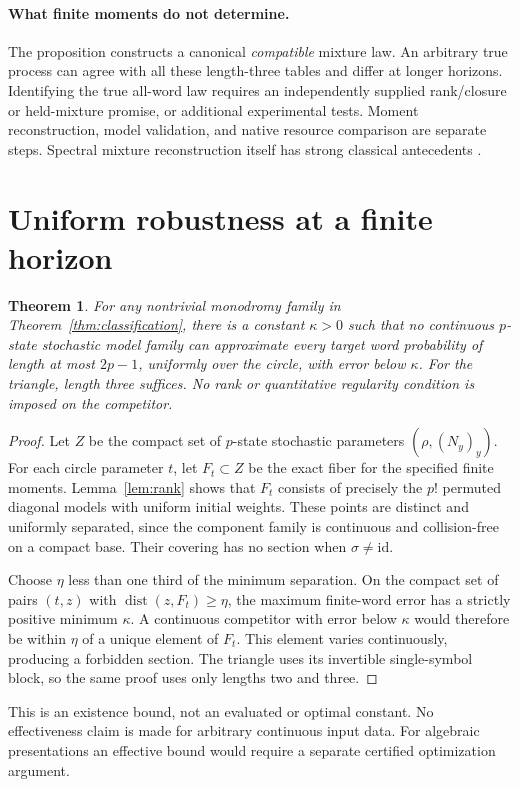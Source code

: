 \documentclass[11pt]{article}
\newtheorem{theorem}{Theorem}[section]
\theoremstyle{definition}\newtheorem{definition}[theorem]{Definition}
\theoremstyle{remark}\newtheorem{remark}[theorem]{Remark}
\newcommand{\dist}{\operatorname{dist}}
\begin{document}
\paragraph{What finite moments do not determine.}
The proposition constructs a canonical \emph{compatible} mixture law. An arbitrary true process can agree with all these length-three tables and differ at longer horizons. Identifying the true all-word law requires an independently supplied rank/closure or held-mixture promise, or additional experimental tests. Moment reconstruction, model validation, and native resource comparison are separate steps. Spectral mixture reconstruction itself has strong classical antecedents \cite{AMR,VS}.

\section{Uniform robustness at a finite horizon}
\begin{theorem}\label{thm:robust}
For any nontrivial monodromy family in Theorem~\ref{thm:classification}, there is a constant $\kappa>0$ such that no continuous $p$-state stochastic model family can approximate every target word probability of length at most $2p-1$, uniformly over the circle, with error below $\kappa$. For the triangle, length three suffices. No rank or quantitative regularity condition is imposed on the competitor.
\end{theorem}
\begin{proof}
Let $Z$ be the compact set of $p$-state stochastic parameters $(\rho,(N_y)_y)$. For each circle parameter $t$, let $F_t\subset Z$ be the exact fiber for the specified finite moments. Lemma~\ref{lem:rank} shows that $F_t$ consists of precisely the $p!$ permuted diagonal models with uniform initial weights. These points are distinct and uniformly separated, since the component family is continuous and collision-free on a compact base. Their covering has no section when $\sigma\ne\mathrm{id}$.

Choose $\eta$ less than one third of the minimum separation. On the compact set of pairs $(t,z)$ with $\dist(z,F_t)\geq\eta$, the maximum finite-word error has a strictly positive minimum $\kappa$. A continuous competitor with error below $\kappa$ would therefore be within $\eta$ of a unique element of $F_t$. This element varies continuously, producing a forbidden section. The triangle uses its invertible single-symbol block, so the same proof uses only lengths two and three.
\end{proof}
This is an existence bound, not an evaluated or optimal constant. No effectiveness claim is made for arbitrary continuous input data. For algebraic presentations an effective bound would require a separate certified optimization argument.
\end{document}

